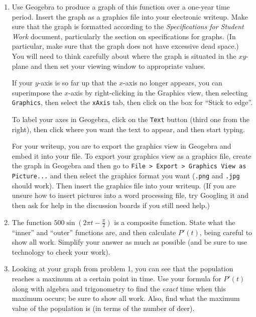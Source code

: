 \documentclass[11pt,letterpaper]{article}
\begin{document}
\begin{enumerate}
	\item Use Geogebra to produce a graph of this function over a one-year time period. Insert the graph as a graphics file into your electronic writeup. Make sure that the graph is formatted according to the \emph{Specifications for Student Work} document, particularly the section on specifications for graphs. (In particular, make sure that the graph does not have excessive dead space.) You will need to think carefully about where the graph is situated in the $xy$-plane and then set your viewing window to appropriate values. 

	If your $y$-axis is so far up that the $x$-axis no longer appears, you can superimpose the $x$-axis by right-clicking in the Graphics view, then selecting \verb.Graphics., then select the \verb=xAxis= tab, then click on the box for ``Stick to edge''. 

	To label your axes in Geogebra, click on the \verb.Text. button (third one from the right), then click where you want the text to appear, and then start typing. 

	For your writeup, you are to export the graphics view in Geogebra and embed it into your file. To export your graphics view as a graphics file, create the graph in Geogebra and then go to \verb=File > Export > Graphics View as Picture...= and then select the graphics format you want (\verb=.png= and \verb=.jpg= should work). Then insert the graphics file into your writeup. (If you are unsure how to insert pictures into a word processing file, try Googling it and then ask for help in the discussion boards if you still need help.)

	\item The function $500 \sin \left(2 \pi t - \frac{\pi}{2}   \right)$ is a composite function. State what the ``inner'' and ``outer'' functions are, and then calculate $P'(t)$, being careful to show all work. Simplify your answer as much as possible (and be sure to use technology to check your work). 


	\item Looking at your graph from problem 1, you can see that the population reaches a maximum at a certain point in time. Use your formula for $P'(t)$ along with algebra and trigonometry to find the \emph{exact} time when this maximum occurs; be sure to show all work. Also, find what the maximum value of the population is (in terms of the number of deer). 


\end{enumerate}
\end{document}
